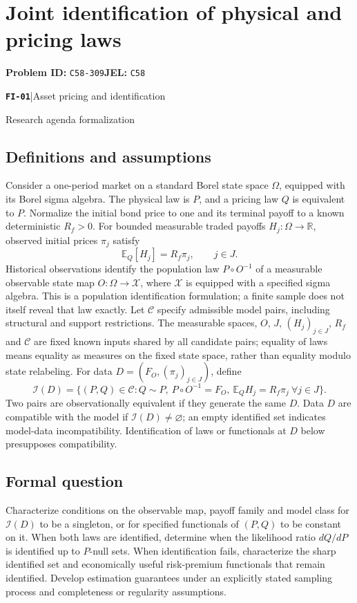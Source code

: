 \documentclass[11pt,a4paper]{article}
\newcommand{\R}{\mathbb R}
\newcommand{\E}{\mathbb E}
\newcommand{\entrymeta}[3]{{\sffamily\small\color{muted}\textbf{\texttt{#1}}\quad|\quad #2\par #3\par}}
\begin{document}
\section*{Joint identification of physical and pricing laws}
\textbf{Problem ID:} \texttt{C58-309}\quad \textbf{JEL:} \texttt{C58}\par
\label{problem:OP-0578}
\label{beyond:FI-01}
\entrymeta{FI-01}{Asset pricing and identification}{Research agenda formalization}
\subsection*{Definitions and assumptions}
Consider a one-period market on a standard Borel state space $\Omega$, equipped with its Borel sigma algebra. The physical law is $P$, and a pricing law $Q$ is equivalent to $P$. Normalize the initial bond price to one and its terminal payoff to a known deterministic $R_f>0$. For bounded measurable traded payoffs $H_j:\Omega\to\R$, observed initial prices $\pi_j$ satisfy
\[
 \E_Q[H_j]=R_f\pi_j,\qquad j\in J.
\]
Historical observations identify the population law $P\circ O^{-1}$ of a measurable observable state map $O:\Omega\to\mathcal X$, where $\mathcal X$ is equipped with a specified sigma algebra. This is a population identification formulation; a finite sample does not itself reveal that law exactly. Let $\mathcal C$ specify admissible model pairs, including structural and support restrictions. The measurable spaces, $O$, $J$, $(H_j)_{j\in J}$, $R_f$ and $\mathcal C$ are fixed known inputs shared by all candidate pairs; equality of laws means equality as measures on the fixed state space, rather than equality modulo state relabeling. For data $D=(F_O,(\pi_j)_{j\in J})$, define
\[
 \mathcal I(D)=\{(P,Q)\in\mathcal C:Q\sim P,\ P\circ O^{-1}=F_O,
 \ \E_QH_j=R_f\pi_j\ \forall j\in J\}.
\]
Two pairs are observationally equivalent if they generate the same $D$. Data $D$ are compatible with the model if $\mathcal I(D)\ne\varnothing$; an empty identified set indicates model-data incompatibility. Identification of laws or functionals at $D$ below presupposes compatibility.
\subsection*{Formal question}
Characterize conditions on the observable map, payoff family and model class for $\mathcal I(D)$ to be a singleton, or for specified functionals of $(P,Q)$ to be constant on it. When both laws are identified, determine when the likelihood ratio $dQ/dP$ is identified up to $P$-null sets. When identification fails, characterize the sharp identified set and economically useful risk-premium functionals that remain identified. Develop estimation guarantees under an explicitly stated sampling process and completeness or regularity assumptions.
\end{document}
